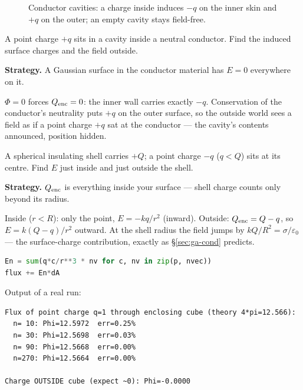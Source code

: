 \begin{figure}[htbp]\centering

\caption{Conductor cavities: a charge inside induces $-q$ on the inner
skin and $+q$ on the outer; an empty cavity stays field-free.}
\label{fig:cavity}
\end{figure}

\begin{example}\label{ex:cavity}
A point charge $+q$ sits in a cavity inside a neutral conductor. Find
the induced surface charges and the field outside.
\par\smallskip
\textbf{Strategy.} A Gaussian surface in the conductor material has
$E=0$ everywhere on it.
\begin{solution}
$\Phi=0$ forces $Q_{\rm enc}=0$: the inner wall carries exactly $-q$.
Conservation of the conductor's neutrality puts $+q$ on the outer
surface, so the outside world sees a field as if a point charge $+q$
sat at the conductor --- the cavity's contents announced, position
hidden. \checkmark
\end{solution}
\end{example}

\begin{example}\label{ex:encl}
A spherical insulating shell carries $+Q$; a point charge $-q$
($q<Q$) sits at its centre. Find $E$ just inside and just outside the
shell.
\par\smallskip
\textbf{Strategy.} $Q_{\rm enc}$ is everything inside your surface ---
shell charge counts only beyond its radius.
\begin{solution}
Inside ($r<R$): only the point, $E=-kq/r^{2}$ (inward).
Outside: $Q_{\rm enc}=Q-q$, so $E=k(Q-q)/r^{2}$ outward.
At the shell radius the field jumps by $kQ/R^{2}=\sigma/\varepsilon_0$
--- the surface-charge contribution, exactly as \S\ref{sec:ga-cond}
predicts. \checkmark
\end{solution}
\end{example}

\begin{lstlisting}[language=Python,caption={\texttt{code/ch10\_flux\_check.py} --- numeric flux through a cube; convergence and the outside-charge zero.},label={lst:flux}]
En = sum(q*c/r**3 * nv for c, nv in zip(p, nvec))
flux += En*dA
\end{lstlisting}

Output of a real run:
\begin{lstlisting}[numbers=none]
Flux of point charge q=1 through enclosing cube (theory 4*pi=12.566):
  n= 10: Phi=12.5972  err=0.25%
  n= 30: Phi=12.5698  err=0.03%
  n= 90: Phi=12.5668  err=0.00%
  n=270: Phi=12.5664  err=0.00%

Charge OUTSIDE cube (expect ~0): Phi=-0.0000
\end{lstlisting}

